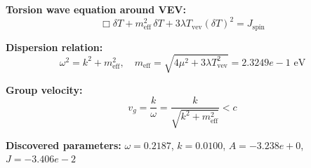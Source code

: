
\textbf{Torsion wave equation around VEV:}
\begin{equation}
  \Box \delta T + m_{\text{eff}}^2 \, \delta T + 3\lambda T_{\text{vev}} (\delta T)^2 = J_{\text{spin}}
\end{equation}

\textbf{Dispersion relation:}
\begin{equation}
  \omega^2 = k^2 + m_{\text{eff}}^2, \quad
  m_{\text{eff}} = \sqrt{4\mu^2 + 3\lambda T_{\text{vev}}^2} = 2.3249e-1 \text{ eV}
\end{equation}

\textbf{Group velocity:}
\begin{equation}
  v_g = \frac{k}{\omega} = \frac{k}{\sqrt{k^2 + m_{\text{eff}}^2}} < c
\end{equation}

\textbf{Discovered parameters:}
$\omega = 0.2187$, \quad
$k = 0.0100$, \quad
$A = -3.238e+0$, \quad
$J = -3.406e-2$